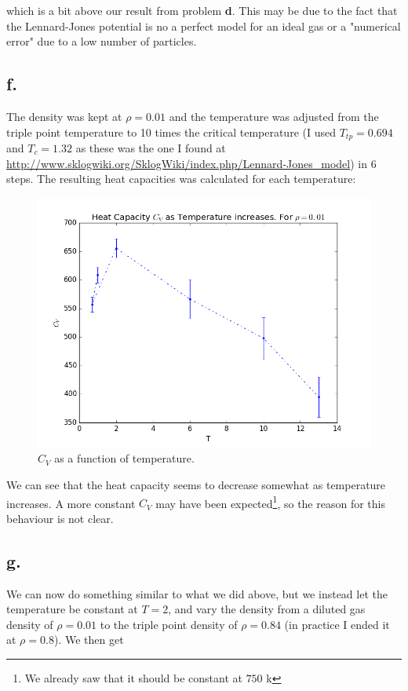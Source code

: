 \documentclass{article}
\begin{document}
which is a bit above our result from problem \textbf{d}. This may be due to the fact that the Lennard-Jones potential is no a perfect model for an ideal gas or a "numerical error" due to a low number of particles.


\subsection*{f.}
The density was kept at $\rho = 0.01$ and the temperature was adjusted from the triple point temperature to 10 times the critical temperature (I used $T_{tp} = 0.694$ and $T_c = 1.32$ as these was the one I found at \url{http://www.sklogwiki.org/SklogWiki/index.php/Lennard-Jones_model}) in 6 steps. The resulting heat capacities was calculated for each temperature:

\begin{figure}[H]
\centering
\includegraphics[scale=0.5]{project_2/problem_f}
\caption{$C_V$ as a function of temperature.}
\label{fig:isoTherm}
\end{figure}

We can see that the heat capacity seems to decrease somewhat as temperature increases. A more constant $C_V$ may have been expected\footnote{We already saw that it should be constant at $750$ k}, so the reason for this behaviour is not clear.

\subsection*{g.}

We can now do something similar to what we did above, but we instead let the temperature be constant at $T=2$, and vary the density from a diluted gas density of $\rho = 0.01$ to the triple point density of $\rho = 0.84$ (in practice I ended it at $\rho = 0.8$). We then get
\end{document}

